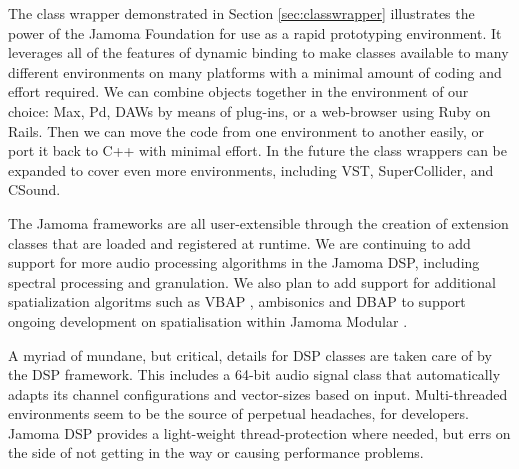 \documentclass[twoside,10pt]{article}
\begin{document}



The class wrapper demonstrated in Section \ref{sec:classwrapper} illustrates the power of the Jamoma Foundation for use as a rapid prototyping environment.  It leverages all of the features of dynamic binding to make classes available to many different environments on many platforms with a minimal amount of coding and effort required.  We can combine objects together in the environment of our choice: Max, Pd, DAWs by means of plug-ins, or a web-browser using Ruby on Rails.  Then we can move the code from one environment to another easily, or port it back to C++ with minimal effort. In the future the class wrappers can be expanded to cover even more environments, including VST, SuperCollider, and CSound.

The Jamoma frameworks are all user-extensible through the creation of extension classes that are loaded and registered at runtime.  We are continuing to add support for more audio processing algorithms in the Jamoma DSP, including spectral processing and granulation. We also plan to add support for additional spatialization algoritms such as VBAP \cite{Pulkki:1997vbap}, ambisonics \cite{Gerzon:1974surround, Poletti:2000holographic_sound} and DBAP \cite{Lossius:2009} to support ongoing development on spatialisation within Jamoma Modular \cite{Peters:2009}.




A myriad of mundane, but critical, details for DSP classes are taken care of by the DSP framework.  This includes a 64-bit audio signal class that automatically adapts its channel configurations and vector-sizes based on input.  Multi-threaded environments seem to be the source of perpetual headaches, for developers.  Jamoma DSP provides a light-weight thread-protection where needed, but errs on the side of not getting in the way or causing performance problems.  
\end{document}
